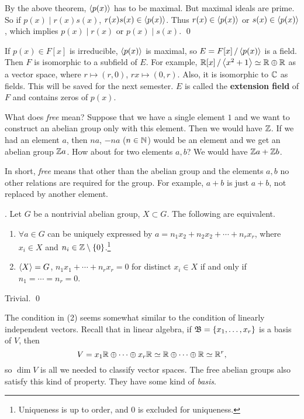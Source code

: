 \pf By the above theorem, \(\left\langle p(x) \right\rangle\) has to be maximal. But maximal ideals are prime. So if \(p(x) \mid r(x)s(x)\), \(r(x)s(x) \in \left\langle p(x) \right\rangle\). Thus \(r(x) \in \left\langle p(x) \right\rangle\) or \(s(x) \in \left\langle p(x) \right\rangle\), which implies \(p(x) \mid r(x)\) or \(p(x) \mid s(x)\). \qed

\rmk If \(p(x) \in F[x]\) is irreducible, \(\left\langle p(x) \right\rangle\) is maximal, so \(E = F[x] \operatorname{/} \left\langle p(x) \right\rangle\) is a field. Then \(F\) is isomorphic to a subfield of \(E\). For example, \(\mathbb{R}[x] \operatorname{/} \left\langle x^2 + 1 \right\rangle \simeq \mathbb{R} \oplus \mathbb{R}\) as a vector space, where \(r \mapsto (r, 0)\), \(rx \mapsto (0, r)\). Also, it is isomorphic to \(\mathbb{C}\) as fields. This will be saved for the next semester. \(E\) is called the \textbf{extension field} of \(F\) and contains zeros of \(p(x)\).

\pagebreak

\setcounter{topic}{37}

What does \textit{free} mean? Suppose that we have a single element \(1\) and we want to construct an abelian group only with this element. Then we would have \(\mathbb{Z}\). If we had an element \(a\), then \(na\), \(-na\) (\(n \in \mathbb{N}\)) would be an element and we get an abelian group \(\mathbb{Z} a\). How about for two elements \(a, b\)? We would have \(\mathbb{Z} a + \mathbb{Z} b\).

In short, \textit{free} means that other than the abelian group and the elements \(a, b\) no other relations are required for the group. For example, \(a + b\) is just \(a + b\), not replaced by another element.

\thm. Let \(G\) be a nontrivial abelian group, \(X \subset G\). The following are equivalent.
\begin{enumerate}
    \item \(\forall a \in G\) can be uniquely expressed by \(a = n_1x_2 + n_2x_2 + \cdots + n_rx_r\), where \(x_i \in X\) and \(n_i \in \mathbb{Z} \setminus \{0\}\).\footnote{Uniqueness is up to order, and 0 is excluded for uniqueness.}
    \item \(\left\langle X \right\rangle = G\), \(n_1x_1 + \cdots + n_rx_r = 0\) for distinct \(x_i \in X\) if and only if \(n_1 = \cdots = n_r = 0\).
\end{enumerate}

\pf Trivial. \qed

\rmk The condition in (2) seems somewhat similar to the condition of linearly independent vectors. Recall that in linear algebra, if \(\mathfrak{B} = \{x_1, \dots, x_r\}\) is a basis of \(V\), then
\[
    V = x_1\mathbb{R} \oplus \cdots \oplus x_r \mathbb{R} \simeq \mathbb{R} \oplus \cdots \oplus \mathbb{R} \simeq \mathbb{R}^r,
\]
so \(\dim V\) is all we needed to classify vector spaces. The free abelian groups also satisfy this kind of property. They have some kind of \textit{basis}.

